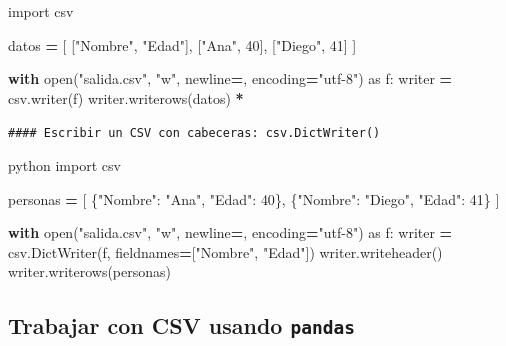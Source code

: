 \documentclass[
]{book}
\newenvironment{Shaded}{\begin{snugshade}}{\end{snugshade}}
\newcommand{\BuiltInTok}[1]{#1}
\newcommand{\CommentTok}[1]{\textcolor[rgb]{0.56,0.35,0.01}{\textit{#1}}}
\newcommand{\ControlFlowTok}[1]{\textcolor[rgb]{0.13,0.29,0.53}{\textbf{#1}}}
\newcommand{\DecValTok}[1]{\textcolor[rgb]{0.00,0.00,0.81}{#1}}
\newcommand{\ImportTok}[1]{#1}
\newcommand{\NormalTok}[1]{#1}
\newcommand{\OperatorTok}[1]{\textcolor[rgb]{0.81,0.36,0.00}{\textbf{#1}}}
\newcommand{\StringTok}[1]{\textcolor[rgb]{0.31,0.60,0.02}{#1}}
\theoremstyle{break}
\theoremstyle{nonumberplain}
\renewcommand{\CommentTok}[1]{\textcolor[rgb]{0.41,0.41,0.41}{\texttt{#1}}}
\begin{document}
\begin{Shaded}
\begin{Highlighting}[]
\ImportTok{import}\NormalTok{ csv}

\NormalTok{datos }\OperatorTok{=}\NormalTok{ [}
\NormalTok{    [}\StringTok{"Nombre"}\NormalTok{, }\StringTok{"Edad"}\NormalTok{],}
\NormalTok{    [}\StringTok{"Ana"}\NormalTok{, }\DecValTok{40}\NormalTok{],}
\NormalTok{    [}\StringTok{"Diego"}\NormalTok{, }\DecValTok{41}\NormalTok{]}
\NormalTok{]}

\ControlFlowTok{with} \BuiltInTok{open}\NormalTok{(}\StringTok{"salida.csv"}\NormalTok{, }\StringTok{"w"}\NormalTok{, newline}\OperatorTok{=}\StringTok{\textquotesingle{}\textquotesingle{}}\NormalTok{, encoding}\OperatorTok{=}\StringTok{"utf{-}8"}\NormalTok{) }\ImportTok{as}\NormalTok{ f:}
\NormalTok{    writer }\OperatorTok{=}\NormalTok{ csv.writer(f)}
\NormalTok{    writer.writerows(datos)}
\NormalTok{\textasciigrave{}\textasciigrave{}\textasciigrave{}}\OperatorTok{*}

\CommentTok{\#\#\#\# Escribir un CSV con cabeceras: \textasciigrave{}csv.DictWriter()\textasciigrave{}}

\NormalTok{\textasciigrave{}\textasciigrave{}\textasciigrave{}python}
\ImportTok{import}\NormalTok{ csv}

\NormalTok{personas }\OperatorTok{=}\NormalTok{ [}
\NormalTok{    \{}\StringTok{"Nombre"}\NormalTok{: }\StringTok{"Ana"}\NormalTok{, }\StringTok{"Edad"}\NormalTok{: }\DecValTok{40}\NormalTok{\},}
\NormalTok{    \{}\StringTok{"Nombre"}\NormalTok{: }\StringTok{"Diego"}\NormalTok{, }\StringTok{"Edad"}\NormalTok{: }\DecValTok{41}\NormalTok{\}}
\NormalTok{]}

\ControlFlowTok{with} \BuiltInTok{open}\NormalTok{(}\StringTok{"salida.csv"}\NormalTok{, }\StringTok{"w"}\NormalTok{, newline}\OperatorTok{=}\StringTok{\textquotesingle{}\textquotesingle{}}\NormalTok{, encoding}\OperatorTok{=}\StringTok{"utf{-}8"}\NormalTok{) }\ImportTok{as}\NormalTok{ f:}
\NormalTok{    writer }\OperatorTok{=}\NormalTok{ csv.DictWriter(f, fieldnames}\OperatorTok{=}\NormalTok{[}\StringTok{"Nombre"}\NormalTok{, }\StringTok{"Edad"}\NormalTok{])}
\NormalTok{    writer.writeheader()}
\NormalTok{    writer.writerows(personas)}
\end{Highlighting}
\end{Shaded}

\subsection{\texorpdfstring{Trabajar con CSV usando \texttt{pandas}}{Trabajar con CSV usando pandas}}\label{trabajar-con-csv-usando-pandas}
\end{document}

